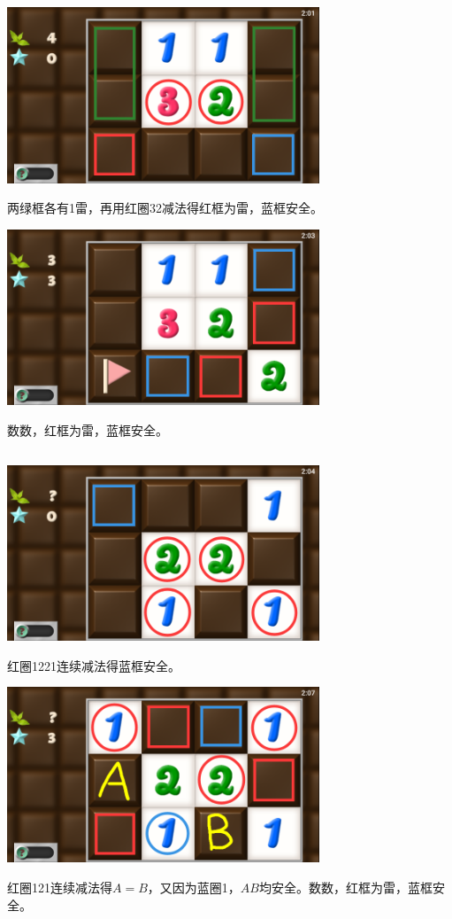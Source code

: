 \subsection{} %
\begin{center}
    \includegraphics[width=0.7\textwidth]{puzzle/24-1.png}
\end{center}
两绿框各有1雷，再用红圈32减法得红框为雷，蓝框安全。
\begin{center}
    \includegraphics[width=0.7\textwidth]{puzzle/24-2.png}
\end{center}
数数，红框为雷，蓝框安全。

\subsection{} %
\begin{center}
    \includegraphics[width=0.7\textwidth]{puzzle/25-1.png}
\end{center}
红圈1221连续减法得蓝框安全。
\begin{center}
    \includegraphics[width=0.7\textwidth]{puzzle/25-2.png}
\end{center}
红圈121连续减法得$A=B$，又因为蓝圈1，$AB$均安全。数数，红框为雷，蓝框安全。

